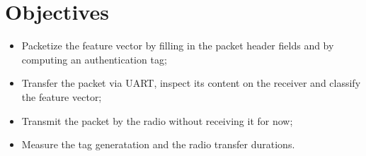 \section*{Objectives}

\begin{itemize}
    \item Packetize the feature vector by filling in the packet header fields and by computing an authentication tag;
    \item Transfer the packet via UART, inspect its content on the receiver and classify the feature vector;
    \item Transmit the packet by the radio without receiving it for now;
    \item Measure the tag generatation and the radio transfer durations.
\end{itemize}
